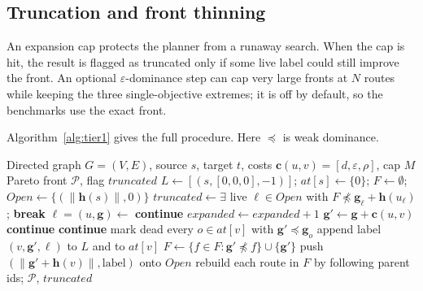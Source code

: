 \subsection{Truncation and front thinning}

An expansion cap protects the planner from a runaway search. When the cap is hit, the
result is flagged as truncated only if some live label could still improve the front.
An optional $\varepsilon$-dominance step can cap very large fronts at $N$ routes while
keeping the three single-objective extremes; it is off by default, so the benchmarks
use the exact front.

Algorithm~\ref{alg:tier1} gives the full procedure. Here $\preceq$ is weak dominance.

\begin{algorithm}[H]
\caption{NAMOA* with a label table (Tier~1)}\label{alg:tier1}
\begin{algorithmic}[1]
\Require Directed graph $G=(V,E)$, source $s$, target $t$, costs $\mathbf{c}(u,v)=[d,\varepsilon,\rho]$, cap $M$
\Ensure Pareto front $\mathcal{P}$, flag $\mathit{truncated}$
\State $L \gets [(s, [0,0,0], -1)]$; $\mathit{at}[s] \gets \{0\}$; $F \gets \emptyset$; $\mathit{Open} \gets \{(\lVert\mathbf{h}(s)\rVert, 0)\}$
    \State $\mathit{truncated} \gets \exists$ live $\ell \in \mathit{Open}$ with $F \not\preceq \mathbf{g}_\ell + \mathbf{h}(u_\ell)$; \textbf{break}
  \EndIf
  \State $\ell = (u, \mathbf{g}) \gets$ 
   \textbf{continue} \EndIf
  \State $\mathit{expanded} \gets \mathit{expanded} + 1$
    \State $\mathbf{g}' \gets \mathbf{g} + \mathbf{c}(u,v)$
     \textbf{continue} 
    \EndIf
     \textbf{continue} 
    \EndIf
    \State mark dead every $o \in \mathit{at}[v]$ with $\mathbf{g}' \preceq \mathbf{g}_o$
    \State append label $(v, \mathbf{g}', \ell)$ to $L$ and to $\mathit{at}[v]$
      \State $F \gets \{f \in F : \mathbf{g}' \not\preceq f\} \cup \{\mathbf{g}'\}$
    \Else
      \State push $(\lVert\mathbf{g}' + \mathbf{h}(v)\rVert, \text{label})$ onto $\mathit{Open}$
    \EndIf
  \EndFor
\EndWhile
\State rebuild each route in $F$ by following parent ids; \Return $\mathcal{P}$, $\mathit{truncated}$
\end{algorithmic}
\end{algorithm}

